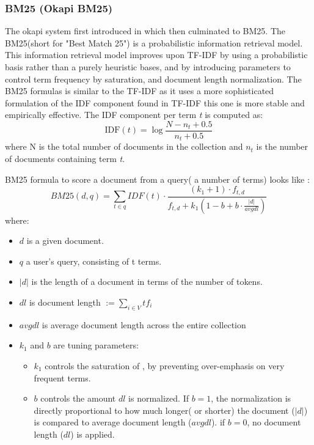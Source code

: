 \subsubsection{BM25 (Okapi BM25)}
The okapi system first introduced in\cite{Bm25foundation} which then culminated to BM25. The BM25(short for "Best Match 25") is a probabilistic information retrieval model. This information retrieval model improves upon TF-IDF by using a probabilistic basis rather than a purely heuristic bases, and by introducing parameters to control term frequency by saturation, and document length normalization.
The BM25 formulas is similar to the TF-IDF as it uses a more sophisticated formulation of the IDF component found in TF-IDF this one is more stable and empirically effective. The IDF component per term \textit{t} is computed as:
\begin{equation}
    \label{eq:idfbm25}
    \text{IDF}(t) = \log \frac{N-n_t+0.5}{n_t+0.5}
\end{equation}
where N is the total number of documents in the collection and $n_t$ is the number of documents containing term \textit{t}.

BM25 formula to score a document from a query( a number of terms) looks like \cite{bm25}:
\begin{equation}
    \label{eq:bm25}
    \textit{BM25}(d,q) = \sum_{t \in q} IDF(t) \cdot \frac{(k_1+1)\cdot f_{t,d}}{f_{t,d}+k_1(1-b+b \cdot \frac{|d|}{avgdl})}
\end{equation}
where:
\begin{itemize}
\item $d$ is a given document.
\item $q$ a user's query, consisting of t terms.
\item $|d|$ is the length of a document in terms of the number of tokens.
\item $dl$ is document length $:=\sum_{i \in V}{tf}_i$
\item $avgdl$ is average document length across the entire collection
\item $k_1$ and $b$ are tuning parameters:
\begin{itemize}
    \item $k_1$ controls  the saturation of , by preventing over-emphasis on very frequent terms.
    \item $b$ controls the amount $dl$ is normalized. If $b = 1$, the normalization is directly proportional to how much longer( or shorter) the document ($|d|$) is compared to average document length ($avgdl$). if $b=0$, no document length ($dl$) is applied.
\end{itemize}
\end{itemize}


